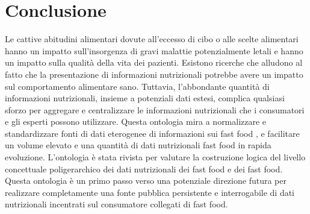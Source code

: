 \section{Conclusione}
Le cattive abitudini alimentari dovute all'eccesso di cibo o alle scelte alimentari hanno un impatto sull'insorgenza di gravi malattie potenzialmente letali e hanno un impatto sulla qualità della vita dei pazienti.
Esistono ricerche che alludono al fatto che la presentazione di informazioni nutrizionali potrebbe avere un impatto sul comportamento alimentare sano. Tuttavia, l'abbondante quantità di informazioni nutrizionali, insieme a potenziali dati estesi, complica qualsiasi sforzo per aggregare e centralizzare le informazioni nutrizionali che i consumatori e gli esperti possono utilizzare. 
Questa ontologia mira a normalizzare e standardizzare fonti di dati eterogenee di informazioni sui fast food , e facilitare un volume elevato e una quantità di dati nutrizionali fast food in rapida evoluzione. 
L'ontologia è stata rivista per valutare la costruzione logica del livello concettuale poligerarchico dei dati nutrizionali dei fast food e dei fast food. 
Questa ontologia è un primo passo verso una potenziale direzione futura per realizzare completamente una fonte pubblica persistente e interrogabile di dati nutrizionali incentrati sul consumatore collegati di fast food.